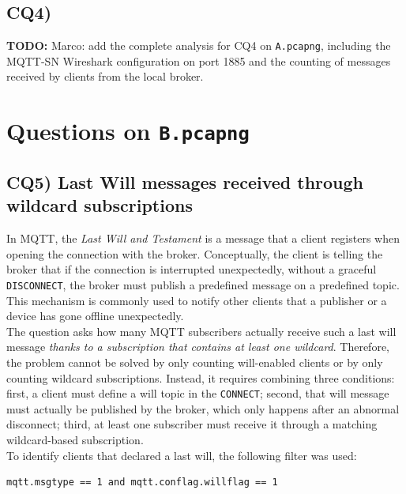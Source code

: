 \documentclass[a4paper,11pt]{article}
\newcommand{\TODO}[1]{
\begin{todobox}
\textbf{TODO:} #1
\end{todobox}
}
\begin{document}
\subsection{CQ4)}
\TODO{Marco: add the complete analysis for CQ4 on \texttt{A.pcapng}, including the MQTT-SN Wireshark configuration on port 1885 and the counting of messages received by clients from the local broker.}

\section{Questions on \texttt{B.pcapng}}

\subsection{CQ5) Last Will messages received through wildcard subscriptions}

In MQTT, the \textit{Last Will and Testament} is a message that a client registers
when opening the connection with the broker. Conceptually, the client is telling the
broker that if the connection is interrupted unexpectedly, without a graceful
\texttt{DISCONNECT}, the broker must publish a predefined message on a predefined
topic. This mechanism is commonly used to notify other clients that a publisher or a
device has gone offline unexpectedly.\\

The question asks how many MQTT subscribers actually receive such a last will message
\emph{thanks to a subscription that contains at least one wildcard}. Therefore, the
problem cannot be solved by only counting will-enabled clients or by only counting
wildcard subscriptions. Instead, it requires combining three conditions: first, a
client must define a will topic in the \texttt{CONNECT}; second, that will message
must actually be published by the broker, which only happens after an abnormal
disconnect; third, at least one subscriber must receive it through a matching
wildcard-based subscription.\\

To identify clients that declared a last will, the following filter was used:

\begin{lstlisting}
mqtt.msgtype == 1 and mqtt.conflag.willflag == 1
\end{lstlisting}
\end{document}
